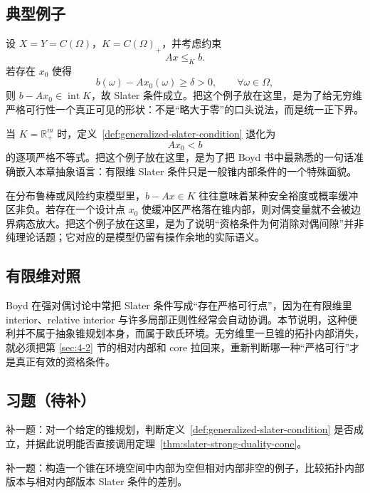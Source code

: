 \subsection{典型例子}

\begin{example}[函数约束留有严格余量]
设 $X=Y=C(\Omega)$，$K=C(\Omega)_+$，并考虑约束
\[
Ax\le_K b.
\]
若存在 $x_0$ 使得
\[
b(\omega)-Ax_0(\omega)\ge \delta>0,\qquad \forall \omega\in \Omega,
\]
则 $b-Ax_0\in \operatorname{int}K$，故 Slater 条件成立。把这个例子放在这里，是为了给无穷维严格可行性一个真正可见的形状：不是“略大于零”的口头说法，而是统一正下界。
\end{example}

\begin{example}
当 $K=\mathbb R_+^m$ 时，定义~\ref{def:generalized-slater-condition} 退化为
\[
Ax_0<b
\]
的逐项严格不等式。把这个例子放在这里，是为了把 Boyd 书中最熟悉的一句话准确嵌入本章抽象语言：有限维 Slater 条件只是一般锥内部条件的一个特殊面貌。
\end{example}

\begin{example}[分布鲁棒约束的缓冲区解释]
在分布鲁棒或风险约束模型里，$b-Ax\in K$ 往往意味着某种安全裕度或概率缓冲区非负。若存在一个设计点 $x_0$ 使缓冲区严格落在锥内部，则对偶变量就不会被边界病态放大。把这个例子放在这里，是为了说明“资格条件为何消除对偶间隙”并非纯理论话题；它对应的是模型仍留有操作余地的实际语义。
\end{example}

\subsection*{有限维对照}

Boyd 在强对偶讨论中常把 Slater 条件写成“存在严格可行点”，因为在有限维里 interior、relative interior 与许多局部正则性经常会自动协调。本节说明，这种便利并不属于抽象锥规划本身，而属于欧氏环境。无穷维里一旦锥的拓扑内部消失，就必须把第 \ref{sec:4-2} 节的相对内部和 core 拉回来，重新判断哪一种“严格可行”才是真正有效的资格条件。

\subsection*{习题（待补）}

\begin{exercise}
补一题：对一个给定的锥规划，判断定义~\ref{def:generalized-slater-condition} 是否成立，并据此说明能否直接调用定理~\ref{thm:slater-strong-duality-cone}。
\end{exercise}

\begin{exercise}[相对内部桥接题占位]
补一题：构造一个锥在环境空间中内部为空但相对内部非空的例子，比较拓扑内部版本与相对内部版本 Slater 条件的差别。
\end{exercise}
